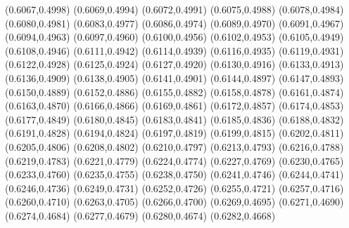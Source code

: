 \PST@Filltriangle(0.6067,0.4998)
\PST@Filltriangle(0.6069,0.4994)
\PST@Filltriangle(0.6072,0.4991)
\PST@Filltriangle(0.6075,0.4988)
\PST@Filltriangle(0.6078,0.4984)
\PST@Filltriangle(0.6080,0.4981)
\PST@Filltriangle(0.6083,0.4977)
\PST@Filltriangle(0.6086,0.4974)
\PST@Filltriangle(0.6089,0.4970)
\PST@Filltriangle(0.6091,0.4967)
\PST@Filltriangle(0.6094,0.4963)
\PST@Filltriangle(0.6097,0.4960)
\PST@Filltriangle(0.6100,0.4956)
\PST@Filltriangle(0.6102,0.4953)
\PST@Filltriangle(0.6105,0.4949)
\PST@Filltriangle(0.6108,0.4946)
\PST@Filltriangle(0.6111,0.4942)
\PST@Filltriangle(0.6114,0.4939)
\PST@Filltriangle(0.6116,0.4935)
\PST@Filltriangle(0.6119,0.4931)
\PST@Filltriangle(0.6122,0.4928)
\PST@Filltriangle(0.6125,0.4924)
\PST@Filltriangle(0.6127,0.4920)
\PST@Filltriangle(0.6130,0.4916)
\PST@Filltriangle(0.6133,0.4913)
\PST@Filltriangle(0.6136,0.4909)
\PST@Filltriangle(0.6138,0.4905)
\PST@Filltriangle(0.6141,0.4901)
\PST@Filltriangle(0.6144,0.4897)
\PST@Filltriangle(0.6147,0.4893)
\PST@Filltriangle(0.6150,0.4889)
\PST@Filltriangle(0.6152,0.4886)
\PST@Filltriangle(0.6155,0.4882)
\PST@Filltriangle(0.6158,0.4878)
\PST@Filltriangle(0.6161,0.4874)
\PST@Filltriangle(0.6163,0.4870)
\PST@Filltriangle(0.6166,0.4866)
\PST@Filltriangle(0.6169,0.4861)
\PST@Filltriangle(0.6172,0.4857)
\PST@Filltriangle(0.6174,0.4853)
\PST@Filltriangle(0.6177,0.4849)
\PST@Filltriangle(0.6180,0.4845)
\PST@Filltriangle(0.6183,0.4841)
\PST@Filltriangle(0.6185,0.4836)
\PST@Filltriangle(0.6188,0.4832)
\PST@Filltriangle(0.6191,0.4828)
\PST@Filltriangle(0.6194,0.4824)
\PST@Filltriangle(0.6197,0.4819)
\PST@Filltriangle(0.6199,0.4815)
\PST@Filltriangle(0.6202,0.4811)
\PST@Filltriangle(0.6205,0.4806)
\PST@Filltriangle(0.6208,0.4802)
\PST@Filltriangle(0.6210,0.4797)
\PST@Filltriangle(0.6213,0.4793)
\PST@Filltriangle(0.6216,0.4788)
\PST@Filltriangle(0.6219,0.4783)
\PST@Filltriangle(0.6221,0.4779)
\PST@Filltriangle(0.6224,0.4774)
\PST@Filltriangle(0.6227,0.4769)
\PST@Filltriangle(0.6230,0.4765)
\PST@Filltriangle(0.6233,0.4760)
\PST@Filltriangle(0.6235,0.4755)
\PST@Filltriangle(0.6238,0.4750)
\PST@Filltriangle(0.6241,0.4746)
\PST@Filltriangle(0.6244,0.4741)
\PST@Filltriangle(0.6246,0.4736)
\PST@Filltriangle(0.6249,0.4731)
\PST@Filltriangle(0.6252,0.4726)
\PST@Filltriangle(0.6255,0.4721)
\PST@Filltriangle(0.6257,0.4716)
\PST@Filltriangle(0.6260,0.4710)
\PST@Filltriangle(0.6263,0.4705)
\PST@Filltriangle(0.6266,0.4700)
\PST@Filltriangle(0.6269,0.4695)
\PST@Filltriangle(0.6271,0.4690)
\PST@Filltriangle(0.6274,0.4684)
\PST@Filltriangle(0.6277,0.4679)
\PST@Filltriangle(0.6280,0.4674)
\PST@Filltriangle(0.6282,0.4668)
